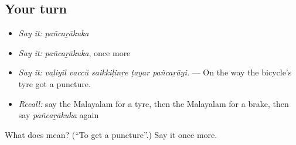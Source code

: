 \subsection*{Your turn}
\begin{itemize}
\raggedright
  \item \emph{Say it:} \emph{pañcaṟākuka}
  \item \emph{Say it:} \emph{pañcaṟākuka}, once more
  \item \emph{Say it:} \emph{vaḻiyil vaccŭ saikkiḷinṟe ṭayar pañcaṟāyi.} — On the way the bicycle's tyre got a puncture.
  \item \emph{Recall:} say the Malayalam for a tyre, then the Malayalam for a brake, then say \emph{pañcaṟākuka} again
\end{itemize}

\begin{tcolorbox}[breakable,colback=teal!4,colframe=teal!35!black,title={Before you move on}]
What does  mean? (\textquotedblleft{}To get a puncture\textquotedblright{}.) Say it once more.
\end{tcolorbox}
